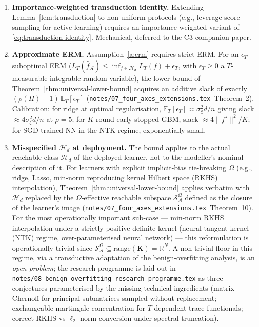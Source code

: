 \documentclass[11pt,a4paper]{article}
\theoremstyle{plain}
\theoremstyle{definition}
\theoremstyle{remark}
\newcommand{\bK}{\mathbf{K}}
\newcommand{\E}{\mathbb{E}}
\newcommand{\R}{\mathbb{R}}
\newcommand{\Scal}{\mathcal{S}}
\newcommand{\Acal}{\mathcal{A}}
\newcommand{\Hcal}{\mathcal{H}}
\begin{document}
\begin{enumerate}[label=(\arabic*),leftmargin=*]
\item \textbf{Importance-weighted transduction identity.}  Extending
    Lemma~\ref{lem:transduction} to non-uniform protocols (e.g.,
    leverage-score sampling for active learning) requires an
    importance-weighted variant of \eqref{eq:transduction-identity}.
    Mechanical, deferred to the C3 companion paper.

\item \textbf{Approximate ERM.}  Assumption~\ref{a:erm} requires
    strict ERM.  For an $\epsilon_T$-suboptimal ERM
    ($L_T(\hat f_\Acal) \le \inf_{f \in \Hcal_d} L_T(f) +
    \epsilon_T$, with $\epsilon_T \ge 0$ a $T$-measurable
    integrable random variable), the lower bound of
    Theorem~\ref{thm:universal-lower-bound} acquires an additive
    slack of exactly $(\rho(\Pi) - 1)\, \E_T[\epsilon_T]$
    (\texttt{notes/07\_four\_axes\_extensions.tex}~Theorem~2).
    Calibration: for ridge at optimal regularisation,
    $\E_T[\epsilon_T] \asymp \sigma_\xi^2 d/n$ giving slack
    $\approx 4\sigma_\xi^2 d/n$ at $\rho = 5$; for $K$-round
    early-stopped GBM, slack $\approx 4\|f^\star\|^2/K$; for
    SGD-trained NN in the NTK regime, exponentially small.

\item \textbf{Misspecified $\Hcal_d$ at deployment.}  The bound applies
    to the actual reachable class $\Hcal_d$ of the deployed learner,
    not to the modeller's nominal description of it.  For learners
    with explicit implicit-bias tie-breaking $\Omega$ (e.g., ridge,
    Lasso, min-norm reproducing kernel Hilbert space (RKHS)
    interpolation), Theorem~\ref{thm:universal-lower-bound}
    applies verbatim with $\Hcal_d$ replaced by the $\Omega$-effective
    reachable subspace $\Scal_\Acal^\Omega$ defined as the closure
    of the learner's image
    (\texttt{notes/07\_four\_axes\_extensions.tex}~Theorem~10).
    For the most operationally important sub-case --- min-norm RKHS
    interpolation under a strictly positive-definite kernel
    (neural tangent kernel (NTK) regime, over-parameterised neural
    network) --- this reformulation is
    operationally trivial since $\Scal_\Acal^\Omega \subseteq
    \mathrm{range}(\bK) = \R^N$. A non-trivial floor in this regime,
    via a transductive adaptation of the
    \citet{BartlettLongLugosiTsigler2020} benign-overfitting analysis,
    is an \emph{open problem}; the research programme is laid out in
    \texttt{notes/08\_benign\_overfitting\_research\_programme.tex}
    as three conjectures parameterised by the missing technical
    ingredients (matrix Chernoff for principal submatrices sampled
    without replacement; exchangeable-martingale concentration for
    $T$-dependent trace functionals; correct RKHS-vs-$\ell_2$ norm
    conversion under spectral truncation).
\end{enumerate}
\end{document}
